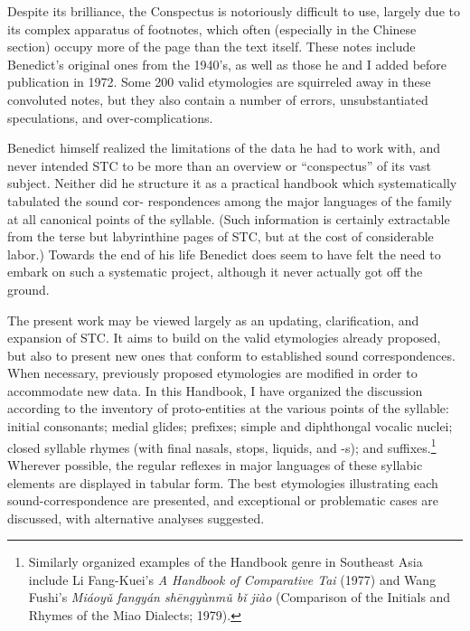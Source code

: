 Despite its brilliance, the Conspectus is notoriously difficult to use, largely due to its complex apparatus of footnotes, which often (especially in the Chinese section) occupy more of the page than the text itself. These notes include Benedict's original ones from the 1940's, as well as those he and I added before publication in 1972. Some 200 valid etymologies are squirreled away in these convoluted notes, but they also contain a number of errors, unsubstantiated speculations, and over-complications.

Benedict himself realized the limitations of the data he had to work with, and never intended STC to be more than an overview or ``conspectus'' of its vast subject. Neither did he structure it as a practical handbook which systematically tabulated the sound cor- respondences among the major languages of the family at all canonical points of the syllable. (Such information is certainly extractable from the terse but labyrinthine pages of STC, but at the cost of considerable labor.) Towards the end of his life Benedict does seem to have felt the need to embark on such a systematic project, although it never actually got off the ground.

The present work may be viewed largely as an updating, clarification, and expansion of STC. It aims to build on the valid etymologies already proposed, but also to present new ones that conform to established sound correspondences. When necessary, previously proposed etymologies are modified in order to accommodate new data.
In this Handbook, I have organized the discussion according to the inventory of proto-entities at the various points of the syllable: initial consonants; medial glides; prefixes; simple and diphthongal vocalic nuclei; closed syllable rhymes (with final nasals, stops, liquids, and -s); and suffixes.\footnote{Similarly organized examples of the Handbook genre in Southeast Asia include Li Fang-Kuei's {\it A Handbook of Comparative Tai} (1977) and Wang Fushi's {\it Mi\'aoy\v{u} fangy\'an sh\=engy\`unm\v{u} b\v{i} ji\`ao} (Comparison of the Initials and Rhymes of the Miao Dialects; 1979).} Wherever possible, the regular reflexes in major languages of these syllabic elements are displayed in tabular form. The best etymologies illustrating each sound-correspondence are presented, and exceptional or problematic cases are discussed, with alternative analyses suggested.

